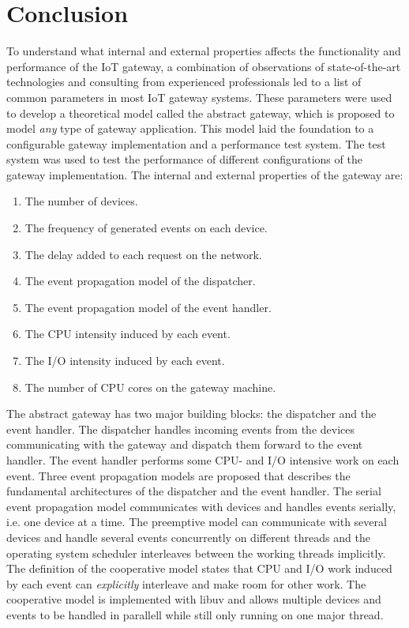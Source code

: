\chapter{Conclusion}
\label{cha:conclusion}

To understand what internal and external properties affects the functionality
and performance of the IoT gateway, a combination of observations of
state-of-the-art technologies and consulting from experienced professionals led
to a list of common parameters in most IoT gateway systems. These parameters
were used to develop a theoretical model called the abstract gateway, which is
proposed to model \textit{any} type of gateway application. This model laid the
foundation to a configurable gateway implementation and a performance test
system. The test system was used to test the performance of different
configurations of the gateway implementation. The internal and external
properties of the gateway are:

\begin{enumerate}

    \item The number of devices.
    \item The frequency of generated events on each device.
    \item The delay added to each request on the network.
    \item The event propagation model of the dispatcher.
    \item The event propagation model of the event handler.
    \item The CPU intensity induced by each event.
    \item The I/O intensity induced by each event.
    \item The number of CPU cores on the gateway machine.

\end{enumerate}

The abstract gateway has two major building blocks: the dispatcher and the
event handler. The dispatcher handles incoming events from the devices
communicating with the gateway and dispatch them forward to the event handler.
The event handler performs some CPU- and I/O intensive work on each event.
Three event propagation models are proposed that describes the fundamental
architectures of the dispatcher and the event handler. The serial event
propagation model communicates with devices and handles events serially, i.e.
one device at a time. The preemptive model can communicate with several devices
and handle several events concurrently on different threads and the operating
system scheduler interleaves between the working threads implicitly. The
definition of the cooperative model states that CPU and I/O work induced by
each event can \textit{explicitly} interleave and make room for other work. The
cooperative model is implemented with libuv and allows multiple devices and
events to be handled in parallell while still only running on one major thread.

